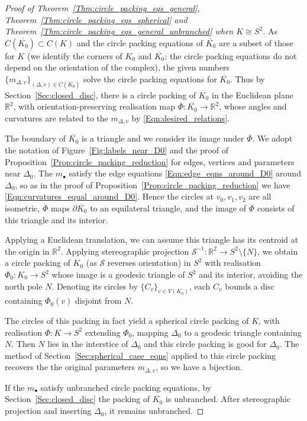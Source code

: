 \documentclass[12pt]{amsart}
\numberwithin{equation}{section}
\theoremstyle{named}
\newcommand{\refsec}[1]{Section~\ref{Sec:#1}}
\newcommand{\reffig}[1]{Figure~\ref{Fig:#1}}
\newcommand{\refeqn}[1]{\eqref{Eqn:#1}}
\newcommand{\refprop}[1]{Proposition~\ref{Prop:#1}}
\newcommand{\refthm}[1]{Theorem~\ref{Thm:#1}}
\newcommand{\R}{\mathbb{R}}
\newcommand{\To}{\longrightarrow}
\begin{document}
\begin{proof}[Proof of \refthm{circle_packing_eqs_general}, \refthm{circle_packing_eqs_spherical} and \refthm{circle_packing_eqs_general_unbranched} when $K \cong S^2$]
As $C(\overline{K_0}) \subset C(K)$ and the circle packing equations of $\overline{K_0}$ are a subset of those for $K$ (we identify the corners of $K_0$ and $\overline{K_0}$; the circle packing equations do not depend on the orientation of the complex), the given numbers $\{m_{\Delta,v}\}_{(\Delta,v) \in C(\overline{K_0})}$ solve the circle packing equations for $\overline{K_0}$. Thus by \refsec{closed_disc}, there is a circle packing of $\overline{K_0}$ in the Euclidean plane $\R^2$, with orientation-preserving realisation map $\overline{\Phi} \colon \overline{K_0} \To \R^2$, whose angles and curvatures are related to the $m_{\Delta,v}$ by \refeqn{desired_relations}. 

The boundary of $\overline{K_0}$ is a triangle and we consider its image under $\overline{\Phi}$. We adopt the notation of \reffig{labels_near_D0} and the proof of \refprop{circle_packing_reduction} for edges, vertices and parameters near $\Delta_0$. The $m_\bullet$ satisfy the edge equations \refeqn{edge_eqns_around_D0} around $\Delta_0$, so as in the proof of \refprop{circle_packing_reduction} we have \refeqn{curvatures_equal_around_D0}. Hence the circles at $v_0, v_1, v_2$ are all isometric, $\overline{\Phi}$ maps $\partial \overline{K_0}$ to an equilateral triangle, and the image of $\overline{\Phi}$ consists of this triangle and its interior.

Applying a Euclidean translation, we can assume this triangle has its centroid at the origin in $\R^2$. Applying stereographic projection $\mathcal{S}^{-1} \colon \R^2 \To S^2 \setminus \{N\}$, we obtain a circle packing of $K_0$ (as $\mathcal{S}$ reverses orientation) in $S^2$ with realisation $\Phi_0 \colon K_0 \To S^2$ whose image is a geodesic triangle of $S^2$ and its interior, avoiding the north pole $N$. Denoting its circles by $\{C_v\}_{v \in V(K_0)}$, each $C_v$ bounds a disc containing $\Phi_0 (v)$ disjoint from $N$.

The circles of this packing in fact yield a spherical circle packing of $K$, with realisation $\Phi \colon K \To S^2$ extending $\Phi_0$, mapping $\Delta_0$ to a geodesic triangle containing $N$. Then $N$ lies in the interstice of $\Delta_0$ and this circle packing is good for $\Delta_0$. The method of \refsec{spherical_case_eqns} applied to this circle packing recovers the the original parameters $m_{\Delta,v}$, so we have a bijection.

If the $m_\bullet$ satisfy unbranched circle packing equations, by \refsec{closed_disc} the packing of $\overline{K_0}$ is unbranched. After stereographic projection and inserting $\Delta_0$, it remains unbranched.
\end{proof}
\end{document}
